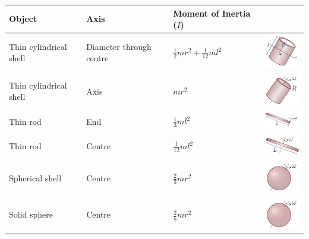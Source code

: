 \documentclass[12pt,a4paper]{article}
\begin{document}
\renewcommand{\arraystretch}{1.5} %
\begin{tabular}{l|llc}
	\textbf{Object} & \textbf{Axis} & \textbf{Moment of Inertia (\( I \))} &\\
	\hline
	Thin cylindrical shell & Diameter through centre & \( \frac{1}{2} m r^2 + \frac{1}{12}ml^2\) & 		\includegraphics[width=2cm]{moiThinSphereDiam.pdf}\\
	\hline
	
	Thin cylindrical shell & Axis & \( mr^2\) & \includegraphics[width=2cm]{page0009.pdf}\\
	\hline
	
	Thin rod & End & \( \frac{1}{3} m l^2 \) &\includegraphics[width=2cm]{page0003.pdf}\\
	\hline
	
	Thin rod & Centre & \( \frac{1}{12} m l^2 \) &\includegraphics[width=2cm]{page0002.pdf}\\
	\hline
	
	Spherical shell & Centre & \( \frac{2}{3} m r^2 \) &\includegraphics[width=2cm]{page0011.pdf}\\
	\hline
	
	Solid sphere & Centre & \( \frac{2}{5} m r^2 \) &\includegraphics[width=2cm]{page0010.pdf}\\
	\hline
	

\end{tabular}
\end{document}
